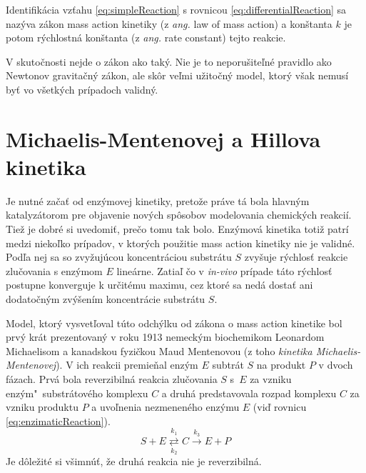 \documentclass[11pt,final,oneside]{fithesis}
\begin{document}
Identifik\'acia vz\v tahu \ref{eq:simpleReaction} s rovnicou \ref{eq:differentialReaction} sa naz\'yva z\'akon mass action kinetiky (z \textit{ang.} law of mass action) a kon\v stanta $k$ 
je potom r\'ychlostn\'a kon\v stanta (z \textit{ang.} rate constant) tejto reakcie.

V skuto\v cnosti nejde o z\'akon ako tak\'y. Nie je to neporu\v site\v ln\'e pravidlo ako Newtonov gravita\v cn\'y z\'akon, ale sk\^ or ve\v lmi 
u\v zito\v cn\'y model, ktor\'y v\v sak nemus\'i by\v t vo v\v setk\'ych pr\'ipadoch validn\'y. \cite{Keener:1998:MP:MassAction}

\section{Michaelis-Mentenovej a Hillova kinetika}
\label{kinetiky}
Je nutn\'e za\v ca\v t od enz\'ymovej kinetiky, preto\v ze pr\'ave t\'a bola hlavn\'ym kataly\-z\'atorom pre objavenie nov\'ych sp\^ osobov modelovania 
chemick\'ych reakci\'i. Tie\v z je dobr\'e si uvedomi\v t, pre\v co tomu tak bolo. Enz\'ymov\'a kinetika toti\v z patr\'i medzi nieko\v lko pr\'ipadov, 
v ktor\'ych pou\v zitie mass action kinetiky nie je validn\'e. Pod\v la nej sa so zvy\v zuj\'ucou koncentr\'aciou substr\'atu $S$ zvy\v suje r\'ychlos\v t
reakcie zlu\v covania s enz\'ymom $E$ line\'arne. Zatia\v l \v co v \textit{in-vivo} pr\'ipade t\'ato r\'ychlos\v t postupne konverguje k ur\v cit\'emu 
maximu, cez ktor\'e sa ned\'a dosta\v t ani dodato\v cn\'ym zv\'y\v sen\'im koncentr\'acie substr\'atu $S$.

Model, ktor\'y vysvet\v loval t\'uto odch\'ylku od z\'akona o mass action kinetike bol prv\'y kr\'at prezentovan\'y v roku 1913 nemeck\'ym biochemikom Leonardom 
Michaelisom a kanadskou fyzi\v ckou Maud Mentenovou (z toho \textit{kinetika Michaelis-Mentenovej}). V ich reakcii premie\v nal enz\'ym $E$ subtr\'at $S$ 
na produkt $P$ v dvoch f\'azach. Prv\'a bola reverzibiln\'a reakcia zlu\v covania $S$ s~$E$ za vzniku enz\'ym"~substr\'atov\'eho komplexu $C$ a druh\'a 
predstavovala rozpad komplexu $C$ za vzniku produktu $P$ a uvo\v lnenia nezmenen\'eho enz\'ymu $E$ (vi\v d rovnicu \ref{eq:enzimaticReaction}).
\begin{equation}
\label{eq:enzimaticReaction}
S + E \underset{k_2}{\overset{k_1}{\rightleftarrows}} C \overset{k_3}{\longrightarrow} E + P
\end{equation}
Je d\^ ole\v zit\'e si v\v simn\'u\v t, \v ze druh\'a reakcia nie je reverzibiln\'a.
\end{document}
